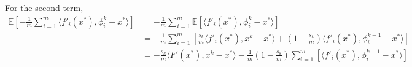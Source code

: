 \documentclass[11pt]{article}
\begin{document}
For the second term, 
\begin{align*}
\mathbb{E} \left[  -  \frac{1}{m}  \sum_{i =1}^{m} \langle f'_i(x^*), \phi_i^{k} - x^*\rangle \right] &= -  \frac{1}{m}  \sum_{i =1}^{m} \mathbb{E} \left[  \langle f'_i(x^*), \phi_i^{k} - x^*\rangle \right] \\
&=  -\frac{1}{m}  \sum_{i =1}^{m} \left[  \frac{s_k}{m}  \langle f'_i(x^*), x^k - x^*\rangle  +  \left(1 - \frac{s_k}{m} \right )  \langle f'_i(x^*), \phi_i^{k-1} - x^*\rangle \right] \\
&=   -\frac{s_k}{m}  \langle F'(x^*), x^k - x^*\rangle  -\frac{1}{m}\left(1 - \frac{s_k}{m} \right )   \sum_{i =1}^{m} \left[   \langle f'_i(x^*), \phi_i^{k-1} - x^*\rangle \right] \\
\end{align*}
\end{document}
